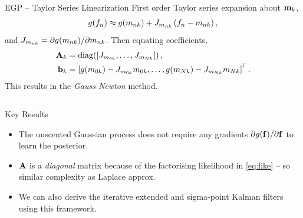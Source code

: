 \documentclass[final]{beamer}
\newlength{\onecolwid}
\newlength{\twocolwid}
\begin{document}
\begin{frame}[t]
\begin{columns}[t]
\begin{column}{\twocolwid}
\begin{columns}[t,totalwidth=\twocolwid]
\begin{column}{\onecolwid}
\begin{block}{EGP -- Taylor Series Linearization}
First order Taylor series expansion about $\mathbf{m}_k$,
\begin{equation*}
    g\!\left({{f_n}}\right) \approx g\!\left({{m_{nk}}}\right) +
        {J}_{m_{nk}}
        \left({f_n - m_{nk}}\right),
\end{equation*}
and ${J}_{m_{nk}} = 
    \partial g\!\left({{m_{nk}}}\right)\!/\partial m_{nk}$. Then equating 
coefficients,
\begin{align}
    \mathbf{A}_k &= \text{diag}\!\left({\left[{{J}_{m_{0k}}, \ldots,
        {J}_{m_{Nk}}}\right]}\right), \\
    \mathbf{b}_k &= \left[{g\!\left({{m_{0k}}}\right) - 
            {J}_{m_{0k}}m_{0k}, \ldots,
            g\!\left({{m_{Nk}}}\right) - {J}_{m_{Nk}}m_{Nk}}\right]
            ^{\!\top}. \nonumber
\end{align}
This results in the \emph{Gauss Newton} method.

\end{block}


\end{column} %

\end{columns} %


\begin{alertblock}{Key Results}

\begin{itemize}

    \item The unscented Gaussian process does not require any gradients
        $\partial g\!\left({{\mathbf{f}}}\right)\!/\partial\mathbf{f}$ to learn the posterior.

    \item $\mathbf{A}$ is a \emph{diagonal} matrix because of the factorising
        likelihood in \eqref{eq:like} -- so similar complexity as Laplace
        approx.

    \item We can also derive the iterative extended and sigma-point Kalman
        filters using this framework.
\end{itemize}


\end{alertblock}
\end{column}
\end{columns}
\end{frame}
\end{document}
